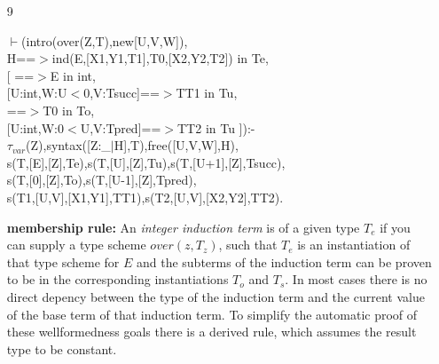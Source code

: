 \documentclass[11pt]{report}
\begin{document}
\begin{enumerate}
 \item[9]
\begin{sf}\begin{tabbing}
$\vdash$(intro(over(Z,T),new[U,V,W]),\\[-0.15ex]
\hspace{2em}H==$>$ind(E,[X1,Y1,T1],T0,[X2,Y2,T2]) in Te,\\[-0.15ex]
\hspace{2em}[ ==$>$E in int,\\[-0.15ex]
\hspace{3em}[U:int,W:U$<$0,V:Tsucc]==$>$TT1 in Tu, \\[-0.15ex]
\hspace{3em}==$>$T0 in To, \\[-0.15ex]
\hspace{3em}[U:int,W:0$<$U,V:Tpred]==$>$TT2 in Tu ]):-\\[-0.15ex]
\hspace{2em}$\tau_{var}$(Z),syntax([Z:\_\hspace{0.1em}$\mid$H],T),free([U,V,W],H),\\[-0.15ex]
\hspace{2em}s(T,[E],[Z],Te),s(T,[U],[Z],Tu),s(T,[U+1],[Z],Tsucc),\\[-0.15ex]
\hspace{2em}s(T,[0],[Z],To),s(T,[U-1],[Z],Tpred),\\[-0.15ex]
\hspace{2em}s(T1,[U,V],[X1,Y1],TT1),s(T2,[U,V],[X2,Y2],TT2).
\end{tabbing}\end{sf}

 {\bf membership rule:}
 An \emph{integer induction term} is of a given type $T_e$ if you can
 supply a type scheme $over(z,T_z)$, such that $T_e$ is an
 instantiation of that type scheme for $E$ and the subterms of
 the induction term can be proven to be in the corresponding
 instantiations $T_o$ and $T_s$. In most cases there is no direct
 depency between the type of the induction term and the current
 value of the base term of that induction term. To simplify
 the automatic proof of these wellformedness goals there is
 a derived rule, which assumes the result type to be constant.
  

\end{enumerate}
\end{document}
